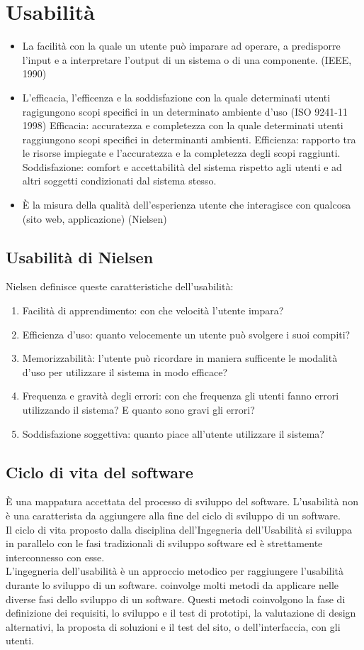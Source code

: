 \documentclass{article}
\begin{document}
\section{Usabilità}
\begin{itemize}
	\item La facilità con la quale un utente può imparare ad operare, a predisporre l'input e a interpretare l'output di un sistema o di una componente. (IEEE, 1990)
	\item L'efficacia, l'efficenza e la soddisfazione con la quale determinati utenti ragigungono scopi specifici in un determinato ambiente d'uso (ISO 9241-11 1998)
	\subitem Efficacia: accuratezza e completezza con la quale determinati utenti raggiungono scopi specifici in determinanti ambienti.
	\subitem Efficienza: rapporto tra le risorse impiegate e l'accuratezza e la completezza degli scopi raggiunti.
	\subitem Soddisfazione: comfort e accettabilità del sistema rispetto agli utenti e ad altri soggetti condizionati dal sistema stesso.
	\item È la misura della qualità dell'esperienza utente che interagisce con qualcosa (sito web, applicazione) (Nielsen)
\end{itemize}
\subsection{Usabilità di Nielsen}
Nielsen definisce queste caratteristiche dell'usabilità:
\begin{enumerate}
	\item Facilità di apprendimento: con che velocità l'utente impara?
	\item Efficienza d'uso: quanto velocemente un utente può svolgere i suoi compiti?
	\item Memorizzabilità: l'utente può ricordare in maniera sufficente le modalità d'uso per utilizzare il sistema in modo efficace?
	\item Frequenza e gravità degli errori: con che frequenza gli utenti fanno errori utilizzando il sistema? E quanto sono gravi gli errori?
	\item Soddisfazione soggettiva: quanto piace all'utente utilizzare il sistema?
\end{enumerate}
\subsection{Ciclo di vita del software}
È una mappatura accettata del processo di sviluppo del software. L'usabilità non è una caratterista da aggiungere alla fine del ciclo di sviluppo di un software.\\
Il ciclo di vita proposto dalla disciplina dell'Ingegneria dell'Usabilità si sviluppa in parallelo con le fasi tradizionali di sviluppo software ed è strettamente interconnesso con esse.\\
L'ingegneria dell'usabilità è un approccio metodico per raggiungere l'usabilità durante lo sviluppo di un software. coinvolge molti metodi da applicare nelle diverse fasi dello sviluppo di un software. Questi metodi coinvolgono la fase di definizione dei requisiti, lo sviluppo e il test di prototipi, la valutazione di design alternativi, la proposta di soluzioni e il test del sito, o dell'interfaccia, con gli utenti.
\end{document}
